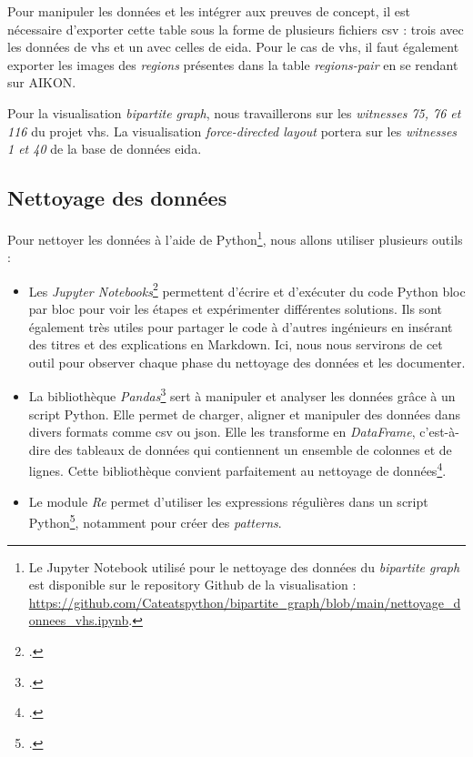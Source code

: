 Pour manipuler les données et les intégrer aux preuves de concept, il est nécessaire d'exporter cette table sous la forme de plusieurs fichiers \gls{csv} : trois avec les données de \gls{vhs} et un avec celles de \gls{eida}. Pour le cas de \gls{vhs}, il faut également exporter les images des \textit{regions} présentes dans la table \textit{regions-pair} en se rendant sur AIKON.

Pour la visualisation \textit{bipartite graph}, nous travaillerons sur les \textit{witnesses 75, 76 et 116} du projet \gls{vhs}. La visualisation \textit{force-directed layout} portera sur les \textit{witnesses 1 et 40} de la base de données \gls{eida}.



\subsection{Nettoyage des données}

Pour nettoyer les données à l'aide de Python\footnote{Le Jupyter Notebook utilisé pour le nettoyage des données du \textit{bipartite graph} est disponible sur le repository Github de la visualisation : \url{https://github.com/Cateatspython/bipartite_graph/blob/main/nettoyage_donnees_vhs.ipynb}.}, nous allons utiliser plusieurs outils : 

\begin{itemize}
	\item Les \textit{Jupyter Notebooks}\footcite{projectjupyterProjectJupyter} permettent d'écrire et d'exécuter du code Python bloc par bloc pour voir les étapes et expérimenter différentes solutions. Ils sont également très utiles pour partager le code à d'autres ingénieurs en insérant des titres et des explications en Markdown. Ici, nous nous servirons de cet outil pour observer chaque phase du nettoyage des données et les documenter.
	\item La bibliothèque \textit{Pandas}\footcite{thepandasdevelopmentteamPandasPythonData2025} sert à manipuler et analyser les données grâce à un script Python. Elle permet de charger, aligner et manipuler des données dans divers formats comme \gls{csv} ou \gls{json}. Elle les transforme en \textit{DataFrame}, c'est-à-dire des tableaux de données qui contiennent un ensemble de colonnes et de lignes. Cette bibliothèque convient parfaitement au nettoyage de données\footcite{datascientestPandasPythonLibrary2023}.
	\item Le module \textit{Re} permet d'utiliser les expressions régulières dans un script Python\footcite{giraudModulePythonStandard2025}, notamment pour créer des \textit{patterns}.
\end{itemize}



